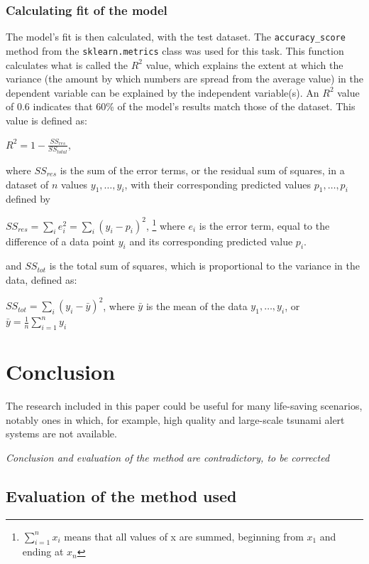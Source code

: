 \documentclass[11pt,letterpaper]{article}
\begin{document}
\subsubsection{Calculating fit of the model}

The model's fit is then calculated, with the test dataset. The \verb|accuracy_score| method from the \verb|sklearn.metrics| class was used for this task. This function calculates what is called the $R^2$ value, which explains the extent at which the variance (the amount by which numbers are spread from the average value) in the dependent variable can be explained by the independent variable(s). An $R^2$ value of 0.6 indicates that 60\% of the model's results match those of the dataset. This value is defined as:

$R^2 = 1 - \frac{SS_{res}}{SS_{total}}$,

where $SS_{res}$ is the sum of the error terms, or the residual sum of squares, in a dataset of $n$ values $y_1,\dots, y_i$, with their corresponding predicted values $p_1,\dots, p_i$ defined by

$SS_{res} = \sum\limits_{i} e_i^2 = \sum\limits_{i} (y_i - p_i)^2$, \footnote{$\sum\limits_{i=1}^n x_i$ means that all values of x are summed, beginning from $x_1$ and ending at $x_n$} where $e_i$ is the error term, equal to the difference of a data point $y_i$ and its corresponding predicted value $p_i$.

and $SS_{tot}$ is the total sum of squares, which is proportional to the variance in the data, defined as:

$SS_{tot} = \sum\limits_{i} (y_i - \bar y)^2$, where $\bar y$ is the mean of the data $y_1,\dots, y_i$, or $\bar y = \frac{1}{n} \sum\limits_{i=1}^n y_i$



\section{Conclusion}

The research included in this paper could be useful for many life-saving scenarios, notably ones in which, for example, high quality and large-scale tsunami alert systems are not available.

\textit{Conclusion and evaluation of the method are contradictory, to be corrected}

\subsection{Evaluation of the method used}
\end{document}

